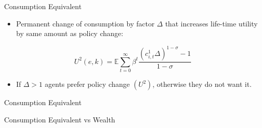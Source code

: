 \documentclass{beamer}
\begin{document}
\begin{frame}{Consumption Equivalent}
  \begin{itemize}

  \item {
  Permanent change of consumption by factor $\Delta$ that increases life-time
  utility by same amount as policy change:
  }
  \end{itemize}
  \begin{equation}
  U^{2}(e,k) = \mathbb{E}\sum_{t=0}^{\infty}\beta^{t}\frac{(c^{1}_{i,t}\Delta)^{1-\sigma}-1}{1-\sigma}\nonumber
  \end{equation}
  \begin{itemize}
  \item {
  If $ \Delta>1 $ agents prefer policy change $ (U^{2}) $, otherwise they do not want it.
  }
  \end{itemize}
\end{frame}

\begin{frame}{Consumption Equivalent}
\end{frame}


\begin{frame}{Consumption Equivalent vs Wealth}
\end{frame}
\end{document}
